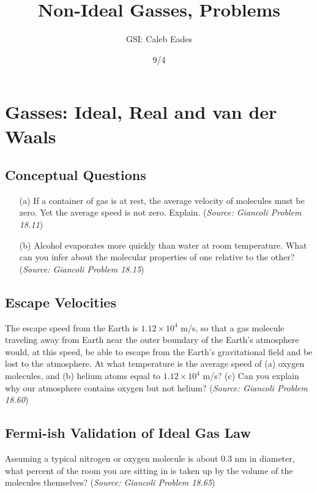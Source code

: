 \documentclass{article}
\begin{document}
	
\title{Non-Ideal Gasses, Problems}
\author{GSI: Caleb Eades}
\date{9/4}
\maketitle

\section{Gasses: Ideal, Real and van der Waals}

\subsection{Conceptual Questions}

\begin{itemize}
	\item[(a)] If a container of gas is at rest, the average velocity of molecules must be zero. Yet the average speed is not zero. Explain. (\textit{Source: Giancoli Problem 18.11})
	\item[(b)] Alcohol evaporates more quickly than water at room temperature. What can you infer about the molecular properties of one relative to the other? (\textit{Source: Giancoli Problem 18.15})
\end{itemize}

\subsection{Escape Velocities}

The escape speed from the Earth is $1.12\times10^4$ m/s, so that a gas molecule traveling away from Earth near the outer boundary of the Earth's atmosphere would, at this speed, be able to escape from the Earth's gravitational field and be lost to the atmosphere. At what temperature is the average speed of (a) oxygen molecules, and (b) helium atoms equal to $1.12\times10^4$ m/s? (c) Can you explain why our atmosphere contains oxygen but not helium? (\textit{Source: Giancoli Problem 18.60})

\subsection{Fermi-ish Validation of Ideal Gas Law}

Assuming a typical nitrogen or oxygen molecule is about $0.3$ nm in diameter, what percent of the room you are sitting in is taken up by the volume of the molecules themselves? (\textit{Source: Giancoli Problem 18.65})
\end{document}
